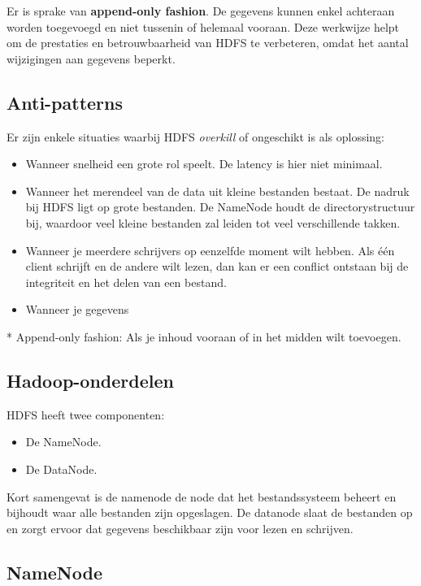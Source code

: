 \documentclass[a4paper,10pt,twoside]{report}
\begin{document}
Er is sprake van \textbf{append-only fashion}. De gegevens kunnen enkel achteraan worden toegevoegd en niet tussenin of helemaal vooraan. Deze werkwijze helpt om de prestaties en betrouwbaarheid van HDFS te verbeteren, omdat het aantal wijzigingen aan gegevens beperkt. 

\subsection{Anti-patterns}

Er zijn enkele situaties waarbij HDFS \textit{overkill} of ongeschikt is als oplossing:

\begin{itemize}
	\item Wanneer snelheid een grote rol speelt. De latency is hier niet minimaal.
	\item Wanneer het merendeel van de data uit kleine bestanden bestaat. De nadruk bij HDFS ligt op grote bestanden. De NameNode houdt de directorystructuur bij, waardoor veel kleine bestanden zal leiden tot veel verschillende takken.
	\item Wanneer je meerdere schrijvers op eenzelfde moment wilt hebben. Als één client schrijft en de andere wilt lezen, dan kan er een conflict ontstaan bij de integriteit en het delen van een bestand.
	\item Wanneer je gegevens
\end{itemize}

* Append-only fashion: Als je inhoud vooraan of in het midden wilt toevoegen.


\subsection{Hadoop-onderdelen}

HDFS heeft twee componenten:

\begin{itemize}
	\item De NameNode.
	\item De DataNode.
\end{itemize}

Kort samengevat is de namenode de node dat het bestandssysteem beheert en bijhoudt waar alle bestanden zijn opgeslagen. De datanode slaat de bestanden op en zorgt ervoor dat gegevens beschikbaar zijn voor lezen en schrijven.

\subsection{NameNode}
\end{document}
